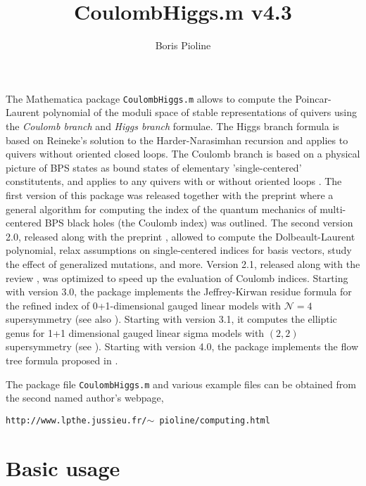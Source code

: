 \documentclass[12pt]{article}
\title{CoulombHiggs.m v4.3}
\author{Boris Pioline}
\newcommand{\cN}{\mathcal{N}}
\begin{document}
\maketitle

\baselineskip 15pt




The  {\sc Mathematica} package {\tt CoulombHiggs.m} allows to compute the Poincar-Laurent polynomial of the moduli space of stable representations of quivers using the {\it Coulomb branch} and {\it Higgs branch} formulae. The Higgs branch formula is based on Reineke's solution to the Harder-Narasimhan recursion \cite{MR1974891} and applies to quivers without oriented closed loops. The Coulomb branch is based on a physical picture of BPS states as bound states of elementary 'single-centered' constitutents, and applies to any quivers with or without oriented loops \cite{1011.1258,1103.1887,Manschot:2012rx}.  
The first version of this package was released together with the preprint \cite{Manschot:2013rx} where a general algorithm for computing the index of the quantum mechanics of multi-centered BPS black holes (the Coulomb index) was outlined. The second version 2.0, released along with the preprint \cite{Manschot:2013}, allowed to compute the Dolbeault-Laurent polynomial, relax assumptions on single-centered indices for basis vectors, study the effect of generalized mutations, and more. Version 2.1, released along with the review \cite{Manschot:2014fua}, was optimized to speed up the evaluation of Coulomb indices.  Starting with version 3.0, the package implements the Jeffrey-Kirwan residue formula for the refined index of 0+1-dimensional gauged linear models with $\cN=4$ supersymmetry \cite{Hori:2014tda} (see also \cite{Cordova:2014oxa}). 
Starting with version 3.1, it  computes the elliptic genus for 1+1 dimensional gauged
linear sigma models with $(2,2)$ supersymmetry (see \cite{Benini:2013xpa}). 
Starting with version 4.0, the package implements the flow tree formula proposed in \cite{Alexandrov:2018iao}.

The package file {\tt CoulombHiggs.m} and various example files 
can be obtained from the second named author's webpage,
\vskip 2mm

\centerline{\tt http://www.lpthe.jussieu.fr/$\sim$\,pioline/computing.html}

\section{Basic usage}
\end{document}
